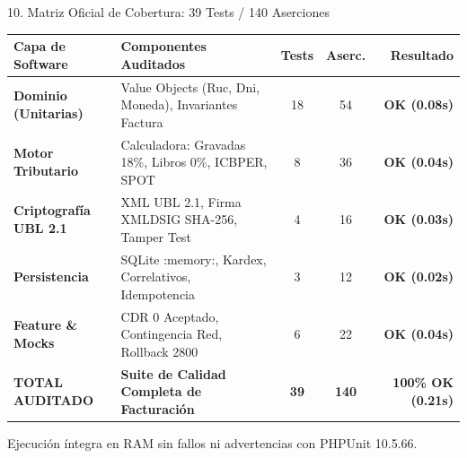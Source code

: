 \documentclass[aspectratio=169,10pt]{beamer}
\begin{document}
\begin{frame}{10. Matriz Oficial de Cobertura: 39 Tests / 140 Aserciones}
\begin{center}
\begin{tcolorbox}[colback=cardbg, colframe=accentblue!50, arc=2.5mm, width=0.96\textwidth, left=2.5mm, right=2.5mm, top=2.5mm, bottom=2.5mm]
\setlength{\tabcolsep}{4pt}
\renewcommand{\arraystretch}{1.25}
{\fontsize{5.8pt}{7.2pt}\selectfont
\begin{tabular}{l p{5.6cm} c c r}
\color{accentblue}\textbf{Capa de Software} & \color{accentblue}\textbf{Componentes Auditados} & \color{accentblue}\textbf{Tests} & \color{accentblue}\textbf{Aserc.} & \color{accentblue}\textbf{Resultado} \\
\hline
\color{textwhite}\textbf{Dominio (Unitarias)} & \color{textgray}Value Objects (Ruc, Dni, Moneda), Invariantes Factura & \color{textwhite}18 & \color{textwhite}54 & \color{accentgreen}\textbf{OK (0.08s)} \\
\color{textwhite}\textbf{Motor Tributario} & \color{textgray}Calculadora: Gravadas 18\%, Libros 0\%, ICBPER, SPOT & \color{textwhite}8 & \color{textwhite}36 & \color{accentgreen}\textbf{OK (0.04s)} \\
\color{textwhite}\textbf{Criptograf\'{i}a UBL 2.1} & \color{textgray}XML UBL 2.1, Firma XMLDSIG SHA-256, Tamper Test & \color{textwhite}4 & \color{textwhite}16 & \color{accentgreen}\textbf{OK (0.03s)} \\
\color{textwhite}\textbf{Persistencia} & \color{textgray}SQLite :memory:, Kardex, Correlativos, Idempotencia & \color{textwhite}3 & \color{textwhite}12 & \color{accentgreen}\textbf{OK (0.02s)} \\
\color{textwhite}\textbf{Feature \& Mocks} & \color{textgray}CDR 0 Aceptado, Contingencia Red, Rollback 2800 & \color{textwhite}6 & \color{textwhite}22 & \color{accentgreen}\textbf{OK (0.04s)} \\
\hline
\color{accentamber}\textbf{TOTAL AUDITADO} & \color{textwhite}\textbf{Suite de Calidad Completa de Facturaci\'{o}n} & \color{accentamber}\textbf{39} & \color{accentamber}\textbf{140} & \color{accentgreen}\textbf{100\% OK (0.21s)} \\
\end{tabular}
}
\end{tcolorbox}
\end{center}
\vspace{0.1cm}
{\centering\fontsize{6pt}{7pt}\selectfont\color{textgray}Ejecuci\'{o}n \'{i}ntegra en RAM sin fallos ni advertencias con PHPUnit 10.5.66.\par}
\end{frame}
\end{document}
